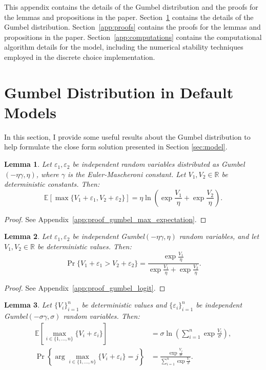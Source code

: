 \documentclass[12pt]{article}
\theoremstyle{plain}
\newtheorem{lemma}{Lemma}
\begin{document}
This appendix contains the details of the Gumbel distribution and the proofs
for the lemmas and propositions in the paper. Section~\ref{app:gumbel} contains
the details of the Gumbel distribution. Section~\ref{app:proofs} contains the
proofs for the lemmas and propositions in the paper.
Section~\ref{app:computations} contains the computational algorithm details for
the model, including the numerical stability techniques employed in the
discrete choice implementation.

\section{Gumbel Distribution in Default Models}\label{app:gumbel}
In this section, I provide some useful results about the Gumbel distribution to
help formulate the close form solution presented in Section \ref{sec:model}.

\begin{lemma}
	\label{lem:gumbel_max_expectation}
	Let $\varepsilon_1, \varepsilon_2$ be independent random variables distributed as Gumbel$(-\eta\gamma, \eta)$, where $\gamma$ is the Euler-Mascheroni constant. Let $V_1, V_2 \in \mathbb{R}$ be deterministic constants. Then:
	\begin{equation}
		\mathbb{E}\left[\max\{V_1 + \varepsilon_1, V_2 + \varepsilon_2\}\right] = \eta \ln\left( \exp\frac{V_1}{\eta} + \exp\frac{V_2}{\eta} \right).
	\end{equation}
\end{lemma}

\begin{proof}
	See Appendix~\ref{app:proof_gumbel_max_expectation}.
\end{proof}

\begin{lemma}
	\label{lem:gumbel_logit}
	Let $\varepsilon_1, \varepsilon_2$ be independent Gumbel$(-\eta\gamma, \eta)$ random variables, and let $V_1, V_2 \in \mathbb{R}$ be deterministic values. Then:
	\begin{equation}
		\Pr\{V_1 + \varepsilon_1 > V_2 + \varepsilon_2\} = \frac{\exp\frac{V_1}{\eta}}{\exp\frac{V_1}{\eta} + \exp\frac{V_2}{\eta}}.
	\end{equation}
\end{lemma}

\begin{proof}
	See Appendix~\ref{app:proof_gumbel_logit}.
\end{proof}

\begin{lemma}
	\label{lem:gumbel_multinomial}
	Let $\{V_i\}_{i=1}^n$ be deterministic values and $\{\varepsilon_i\}_{i=1}^n$ be independent Gumbel$(-\sigma\gamma, \sigma)$ random variables. Then:
	\begin{align}
		\mathbb{E}\left[\max_{i \in \{1,\ldots,n\}} \{V_i + \varepsilon_i\}\right]    & = \sigma \ln\left( \sum_{i=1}^n \exp\frac{V_i}{\sigma} \right),       \\
		\Pr\left\{\arg\max_{i \in \{1,\ldots,n\}} \{V_i + \varepsilon_i\} = j\right\} & = \frac{\exp\frac{V_j}{\sigma}}{\sum_{i=1}^n \exp\frac{V_i}{\sigma}}.
	\end{align}
\end{lemma}
\end{document}
